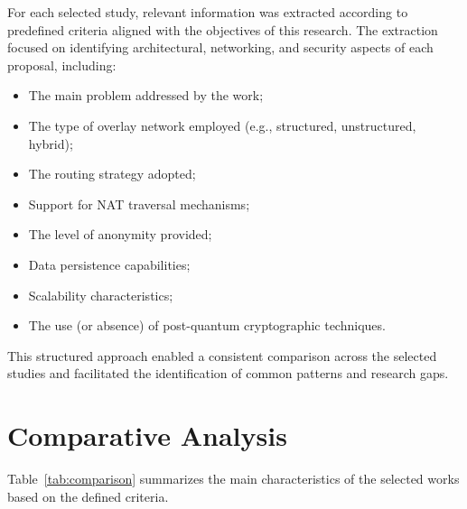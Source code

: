 \documentclass[
  12pt,
  oneside,
  a4paper,
  chapter=TITLE,
  section=TITLE,
  english,
  brazil
]{abntex2}
\begin{document}
For each selected study, relevant information was extracted according to predefined criteria aligned with the objectives of this research. The extraction focused on identifying architectural, networking, and security aspects of each proposal, including:

\begin{itemize}
    \item The main problem addressed by the work;
    \item The type of overlay network employed (e.g., structured, unstructured, hybrid);
    \item The routing strategy adopted;
    \item Support for NAT traversal mechanisms;
    \item The level of anonymity provided;
    \item Data persistence capabilities;
    \item Scalability characteristics;
    \item The use (or absence) of post-quantum cryptographic techniques.
\end{itemize}

This structured approach enabled a consistent comparison across the selected studies and facilitated the identification of common patterns and research gaps.

\section{Comparative Analysis}

Table~\ref{tab:comparison} summarizes the main characteristics of the selected works based on the defined criteria.
\end{document}
